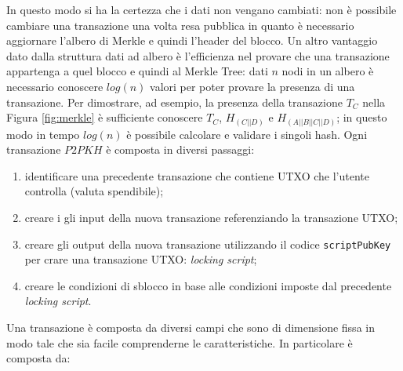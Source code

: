 In questo modo si ha la certezza che i dati non vengano cambiati: non è possibile cambiare una transazione una volta resa pubblica in quanto è necessario aggiornare l'albero di Merkle e quindi l'header del blocco.
Un altro vantaggio dato dalla struttura dati ad albero è l'efficienza nel provare che una transazione appartenga a quel blocco e quindi al Merkle Tree: dati $n$ nodi in un albero è necessario conoscere $log(n)$ valori per poter provare la presenza di una transazione.\newline
Per dimostrare, ad esempio, la presenza della transazione $T_C$ nella Figura \ref{fig:merkle} è sufficiente conoscere $T_C$, $H_{(C||D)}$ e $H_{(A||B||C||D)}$; in questo modo in tempo  $log(n)$ è possibile calcolare e validare i singoli hash.\newline
Ogni transazione $P2PKH$ è composta in diversi passaggi:
\begin{enumerate}[1.]
    \item identificare una precedente transazione che contiene UTXO che l'utente controlla (valuta spendibile);
    \item creare i gli input della nuova transazione referenziando la transazione UTXO;
    \item creare gli output della nuova transazione utilizzando il codice \texttt{scriptPubKey} per crare una transazione UTXO: \textit{locking script};
    \item creare le condizioni di sblocco in base alle condizioni imposte dal precedente \textit{locking script}.
\end{enumerate}
Una transazione è composta da diversi campi che sono di dimensione fissa in modo tale che sia facile comprenderne le caratteristiche. In particolare è composta da:
